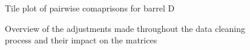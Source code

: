 \documentclass[
  12pt]{article}
\begin{document}
\begin{figure}[H]


\caption{\label{fig-matrixD}Tile plot of pairwise comaprisons for barrel
D}

\end{figure}%

\begin{figure}[H]


\caption{\label{fig-matrixDAdjustments}Overview of the adjustments made
throughout the data cleaning process and their impact on the matrices}

\end{figure}%
\end{document}
